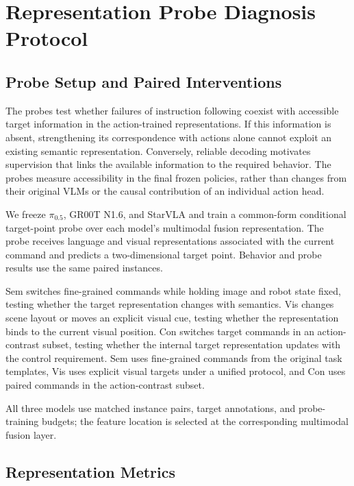 \section{Representation Probe Diagnosis Protocol}
\label{appendix:representation-diagnostics}

\subsection{Probe Setup and Paired Interventions}

The probes test whether failures of instruction following coexist with accessible target information
in the action-trained representations. If this information is absent, strengthening its
correspondence with actions alone cannot exploit an existing semantic representation. Conversely,
reliable decoding motivates supervision that links the available information to the required
behavior. The probes measure accessibility in the final frozen policies, rather than changes from
their original VLMs or the causal contribution of an individual action head.

We freeze $\pi_{0.5}$, GR00T N1.6, and StarVLA and train a common-form
conditional target-point probe over each model's multimodal fusion
representation. The probe receives language and visual representations
associated with the current command and predicts a two-dimensional target
point. Behavior and probe results use the same paired instances.

Sem switches fine-grained commands while holding image and robot state
fixed, testing whether the target representation changes with semantics.
Vis changes scene layout or moves an explicit visual cue, testing whether
the representation binds to the current visual position. Con switches
target commands in an action-contrast subset, testing whether the internal
target representation updates with the control requirement. Sem uses
fine-grained commands from the original task templates, Vis uses explicit
visual targets under a unified protocol, and Con uses paired commands in
the action-contrast subset.

All three models use matched instance pairs, target annotations, and probe-training
budgets; the feature location is selected at the corresponding multimodal
fusion layer.

\subsection{Representation Metrics}

